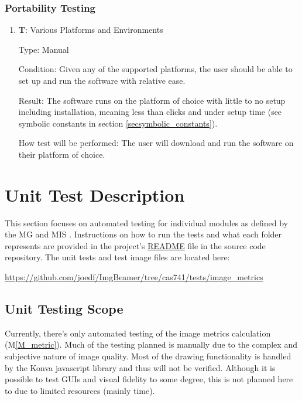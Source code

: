 \documentclass[12pt, titlepage]{article}
\newcommand{\mref}[1]{M\ref{#1}}
\newcounter{testnum} %
\begin{document}
\subsubsection{Portability Testing}
\begin{enumerate}

  \item{\textbf{T\thetestnum \label{T_portability}}: Various Platforms and Environments\\}

  Type: Manual
            
  Condition: Given any of the supported platforms, the user should be able to set up and 
    run the software with relative ease.
            
  Result: The software runs on the platform of choice with little to no setup including 
    installation, meaning less than 
    clicks and under 
    setup time (see symbolic constants in section \ref{secsymbolic_constants}).
            
  How test will be performed: The user will download and run the software on their
    platform of choice.
  
\end{enumerate}



\section{Unit Test Description} \label{sec_unittest}

This section focuses on automated testing for individual modules as defined by the
MG \cite{MG} and MIS \cite{MIS}.
Instructions on how to run the tests and what each folder represents are provided
in the project's \href{https://github.com/joedf/ImgBeamer/blob/cas741/README.md}{README}
file in the source code repository.
The unit tests and test image files are located here:

\url{https://github.com/joedf/ImgBeamer/tree/cas741/tests/image_metrics}



\subsection{Unit Testing Scope} \label{sec_unittest_scope}

Currently, there's only automated testing of the image metrics calculation (\mref{M_metric}).
Much of the testing planned is manually due to the complex and subjective nature of 
image quality. 
Most of the drawing functionality is handled by the Konva javascript library \cite{konva_2021}
and thus will not be verified.
Although it is possible to test GUIs and visual fidelity to some degree, this
is not planned here to due to limited resources (mainly time).
\end{document}
